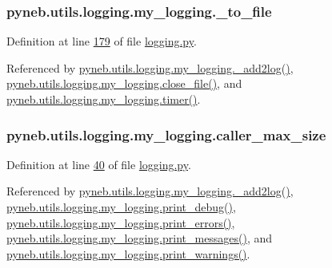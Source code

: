 \subsubsection[{\+\_\+to\+\_\+file}]{\setlength{\rightskip}{0pt plus 5cm}pyneb.\+utils.\+logging.\+my\+\_\+logging.\+\_\+to\+\_\+file\hspace{0.3cm}{\ttfamily [private]}}\label{classpyneb_1_1utils_1_1logging_1_1my__logging_a6fd66745606a3cc0477edafcfdd24fe2}


Definition at line \hyperlink{logging_8py_source_l00179}{179} of file \hyperlink{logging_8py_source}{logging.\+py}.



Referenced by \hyperlink{logging_8py_source_l00059}{pyneb.\+utils.\+logging.\+my\+\_\+logging.\+\_\+add2log()}, \hyperlink{logging_8py_source_l00183}{pyneb.\+utils.\+logging.\+my\+\_\+logging.\+close\+\_\+file()}, and \hyperlink{logging_8py_source_l00115}{pyneb.\+utils.\+logging.\+my\+\_\+logging.\+timer()}.

\hypertarget{classpyneb_1_1utils_1_1logging_1_1my__logging_a0449825f771bc794da88ba49666726d5}{}
\subsubsection[{caller\+\_\+max\+\_\+size}]{\setlength{\rightskip}{0pt plus 5cm}pyneb.\+utils.\+logging.\+my\+\_\+logging.\+caller\+\_\+max\+\_\+size}\label{classpyneb_1_1utils_1_1logging_1_1my__logging_a0449825f771bc794da88ba49666726d5}


Definition at line \hyperlink{logging_8py_source_l00040}{40} of file \hyperlink{logging_8py_source}{logging.\+py}.



Referenced by \hyperlink{logging_8py_source_l00059}{pyneb.\+utils.\+logging.\+my\+\_\+logging.\+\_\+add2log()}, \hyperlink{logging_8py_source_l00157}{pyneb.\+utils.\+logging.\+my\+\_\+logging.\+print\+\_\+debug()}, \hyperlink{logging_8py_source_l00149}{pyneb.\+utils.\+logging.\+my\+\_\+logging.\+print\+\_\+errors()}, \hyperlink{logging_8py_source_l00133}{pyneb.\+utils.\+logging.\+my\+\_\+logging.\+print\+\_\+messages()}, and \hyperlink{logging_8py_source_l00141}{pyneb.\+utils.\+logging.\+my\+\_\+logging.\+print\+\_\+warnings()}.

